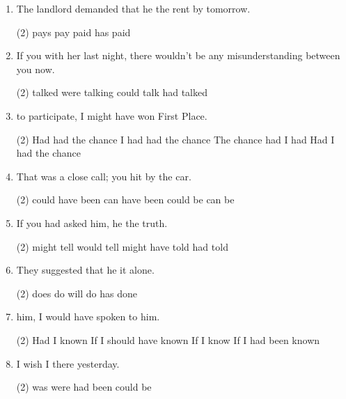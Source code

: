 \begin{enumerate}
\item The landlord demanded that he \ttu the rent by tomorrow.
  \begin{tasks}(2)
    \task pays
    \task pay
    \task paid
    \task has paid
  \end{tasks}

\item If you \ttu with her last night, there wouldn't be any misunderstanding between you now.
  \begin{tasks}(2)
    \task talked
    \task were talking
    \task could talk
    \task had talked
  \end{tasks}

\item \ttu to participate, I might have won First Place.
  \begin{tasks}(2)
    \task Had had the chance
    \task I had had the chance
    \task The chance had I had
    \task Had I had the chance
  \end{tasks}

\item That was a close call; you \ttu hit by the car.
  \begin{tasks}(2)
    \task could have been
    \task can have been
    \task could be
    \task can be
  \end{tasks}

\item If you had asked him, he \ttu the truth.
  \begin{tasks}(2)
    \task might tell
    \task would tell
    \task might have told
    \task had told
  \end{tasks}

\item They suggested that he \ttu it alone.
  \begin{tasks}(2)
    \task does
    \task do
    \task will do
    \task has done
  \end{tasks}

\item \ttu him, I would have spoken to him.
  \begin{tasks}(2)
    \task Had I known
    \task If I should have known
    \task If I know
    \task If I had been known
  \end{tasks}

\item I wish I \ttu there yesterday.
  \begin{tasks}(2)
    \task was
    \task were
    \task had been
    \task could be
  \end{tasks}


\end{enumerate}
